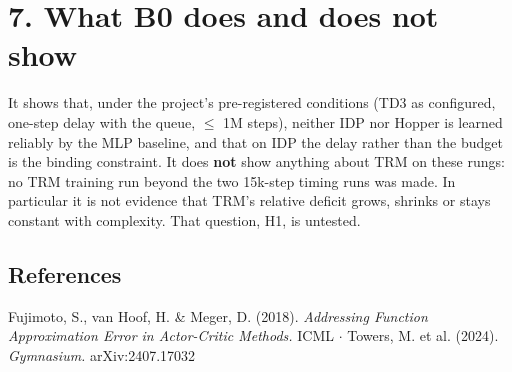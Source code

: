 \documentclass[11pt]{article}
\begin{document}
\section*{7. What B0 does and does not show}



It shows that, under the project's pre-registered conditions (TD3 as configured, one-step delay with the queue, $\leq$ 1M steps), neither IDP nor Hopper is learned reliably by the MLP baseline, and that on IDP the delay rather than the budget is the binding constraint. It does \textbf{not} show anything about TRM on these rungs: no TRM training run beyond the two 15k-step timing runs was made. In particular it is not evidence that TRM's relative deficit grows, shrinks or stays constant with complexity. That question, H1, is untested.



\subsection*{References}



Fujimoto, S., van Hoof, H. \& Meger, D. (2018). \emph{Addressing Function Approximation Error in Actor-Critic Methods.} ICML $\cdot$ Towers, M. et al. (2024). \emph{Gymnasium.} arXiv:2407.17032
\end{document}
